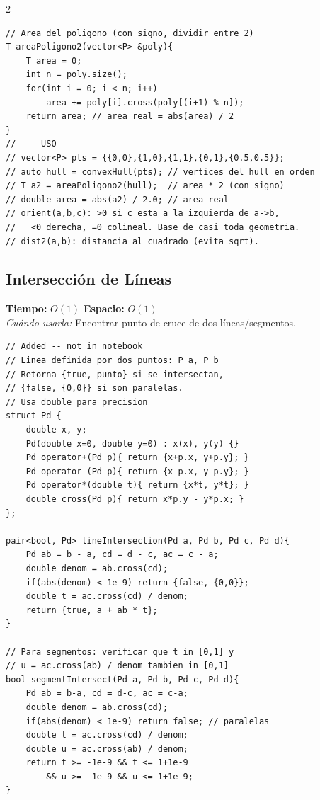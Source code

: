 \documentclass[10pt,a4paper]{article}
\begin{document}
\begin{multicols}{2}
\begin{lstlisting}
// Area del poligono (con signo, dividir entre 2)
T areaPoligono2(vector<P> &poly){
    T area = 0;
    int n = poly.size();
    for(int i = 0; i < n; i++)
        area += poly[i].cross(poly[(i+1) % n]);
    return area; // area real = abs(area) / 2
}
// --- USO ---
// vector<P> pts = {{0,0},{1,0},{1,1},{0,1},{0.5,0.5}};
// auto hull = convexHull(pts); // vertices del hull en orden
// T a2 = areaPoligono2(hull);  // area * 2 (con signo)
// double area = abs(a2) / 2.0; // area real
// orient(a,b,c): >0 si c esta a la izquierda de a->b,
//   <0 derecha, =0 colineal. Base de casi toda geometria.
// dist2(a,b): distancia al cuadrado (evita sqrt).
\end{lstlisting}

\subsection{Intersecci\'on de L\'ineas}
\textbf{Tiempo:} $O(1)$ \quad \textbf{Espacio:} $O(1)$\\
\textit{Cu\'ando usarla:} Encontrar punto de cruce de dos l\'ineas/segmentos.

\begin{lstlisting}
// Added -- not in notebook
// Linea definida por dos puntos: P a, P b
// Retorna {true, punto} si se intersectan,
// {false, {0,0}} si son paralelas.
// Usa double para precision
struct Pd {
    double x, y;
    Pd(double x=0, double y=0) : x(x), y(y) {}
    Pd operator+(Pd p){ return {x+p.x, y+p.y}; }
    Pd operator-(Pd p){ return {x-p.x, y-p.y}; }
    Pd operator*(double t){ return {x*t, y*t}; }
    double cross(Pd p){ return x*p.y - y*p.x; }
};

pair<bool, Pd> lineIntersection(Pd a, Pd b, Pd c, Pd d){
    Pd ab = b - a, cd = d - c, ac = c - a;
    double denom = ab.cross(cd);
    if(abs(denom) < 1e-9) return {false, {0,0}};
    double t = ac.cross(cd) / denom;
    return {true, a + ab * t};
}

// Para segmentos: verificar que t in [0,1] y
// u = ac.cross(ab) / denom tambien in [0,1]
bool segmentIntersect(Pd a, Pd b, Pd c, Pd d){
    Pd ab = b-a, cd = d-c, ac = c-a;
    double denom = ab.cross(cd);
    if(abs(denom) < 1e-9) return false; // paralelas
    double t = ac.cross(cd) / denom;
    double u = ac.cross(ab) / denom;
    return t >= -1e-9 && t <= 1+1e-9
        && u >= -1e-9 && u <= 1+1e-9;
}
\end{lstlisting}

\end{multicols}
\newpage
\end{document}
